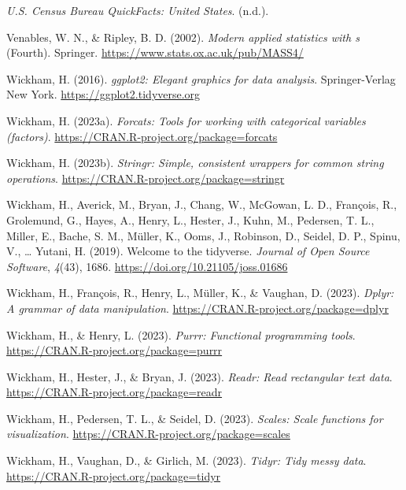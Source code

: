 \documentclass[
  man,floatsintext]{apa7}
\newlength{\cslhangindent}
\newlength{\cslentryspacingunit} %
\newenvironment{CSLReferences}[2] %
 {%
  \setlength{\parindent}{0pt}
  \ifodd #1
  \let\oldpar\par
  \def\par{\hangindent=\cslhangindent\oldpar}
  \fi
  \setlength{\parskip}{#2\cslentryspacingunit}
 }%
 {}
\begin{document}
\begin{CSLReferences}{1}{0}
\leavevmode{}%
\emph{U.{S}. {Census Bureau QuickFacts}: {United States}}. (n.d.).

\leavevmode{}%
Venables, W. N., \& Ripley, B. D. (2002). \emph{Modern applied statistics with s} (Fourth). Springer. \url{https://www.stats.ox.ac.uk/pub/MASS4/}

\leavevmode{}%
Wickham, H. (2016). \emph{ggplot2: Elegant graphics for data analysis}. Springer-Verlag New York. \url{https://ggplot2.tidyverse.org}

\leavevmode{}%
Wickham, H. (2023a). \emph{Forcats: Tools for working with categorical variables (factors)}. \url{https://CRAN.R-project.org/package=forcats}

\leavevmode{}%
Wickham, H. (2023b). \emph{Stringr: Simple, consistent wrappers for common string operations}. \url{https://CRAN.R-project.org/package=stringr}

\leavevmode{}%
Wickham, H., Averick, M., Bryan, J., Chang, W., McGowan, L. D., François, R., Grolemund, G., Hayes, A., Henry, L., Hester, J., Kuhn, M., Pedersen, T. L., Miller, E., Bache, S. M., Müller, K., Ooms, J., Robinson, D., Seidel, D. P., Spinu, V., \ldots{} Yutani, H. (2019). Welcome to the {tidyverse}. \emph{Journal of Open Source Software}, \emph{4}(43), 1686. \url{https://doi.org/10.21105/joss.01686}

\leavevmode{}%
Wickham, H., François, R., Henry, L., Müller, K., \& Vaughan, D. (2023). \emph{Dplyr: A grammar of data manipulation}. \url{https://CRAN.R-project.org/package=dplyr}

\leavevmode{}%
Wickham, H., \& Henry, L. (2023). \emph{Purrr: Functional programming tools}. \url{https://CRAN.R-project.org/package=purrr}

\leavevmode{}%
Wickham, H., Hester, J., \& Bryan, J. (2023). \emph{Readr: Read rectangular text data}. \url{https://CRAN.R-project.org/package=readr}

\leavevmode{}%
Wickham, H., Pedersen, T. L., \& Seidel, D. (2023). \emph{Scales: Scale functions for visualization}. \url{https://CRAN.R-project.org/package=scales}

\leavevmode{}%
Wickham, H., Vaughan, D., \& Girlich, M. (2023). \emph{Tidyr: Tidy messy data}. \url{https://CRAN.R-project.org/package=tidyr}


\end{CSLReferences}
\end{document}
